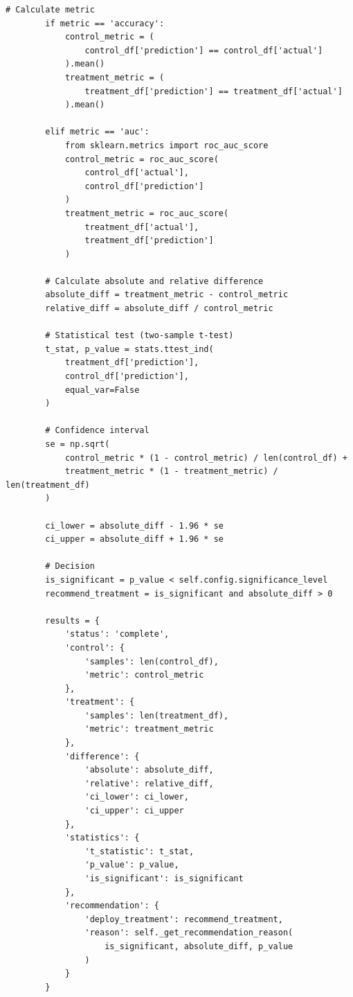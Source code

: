\begin{lstlisting}[style=python, caption=A/B Testing Framework for ML Models]
        # Calculate metric
        if metric == 'accuracy':
            control_metric = (
                control_df['prediction'] == control_df['actual']
            ).mean()
            treatment_metric = (
                treatment_df['prediction'] == treatment_df['actual']
            ).mean()

        elif metric == 'auc':
            from sklearn.metrics import roc_auc_score
            control_metric = roc_auc_score(
                control_df['actual'],
                control_df['prediction']
            )
            treatment_metric = roc_auc_score(
                treatment_df['actual'],
                treatment_df['prediction']
            )

        # Calculate absolute and relative difference
        absolute_diff = treatment_metric - control_metric
        relative_diff = absolute_diff / control_metric

        # Statistical test (two-sample t-test)
        t_stat, p_value = stats.ttest_ind(
            treatment_df['prediction'],
            control_df['prediction'],
            equal_var=False
        )

        # Confidence interval
        se = np.sqrt(
            control_metric * (1 - control_metric) / len(control_df) +
            treatment_metric * (1 - treatment_metric) / len(treatment_df)
        )

        ci_lower = absolute_diff - 1.96 * se
        ci_upper = absolute_diff + 1.96 * se

        # Decision
        is_significant = p_value < self.config.significance_level
        recommend_treatment = is_significant and absolute_diff > 0

        results = {
            'status': 'complete',
            'control': {
                'samples': len(control_df),
                'metric': control_metric
            },
            'treatment': {
                'samples': len(treatment_df),
                'metric': treatment_metric
            },
            'difference': {
                'absolute': absolute_diff,
                'relative': relative_diff,
                'ci_lower': ci_lower,
                'ci_upper': ci_upper
            },
            'statistics': {
                't_statistic': t_stat,
                'p_value': p_value,
                'is_significant': is_significant
            },
            'recommendation': {
                'deploy_treatment': recommend_treatment,
                'reason': self._get_recommendation_reason(
                    is_significant, absolute_diff, p_value
                )
            }
        }


\end{lstlisting}

